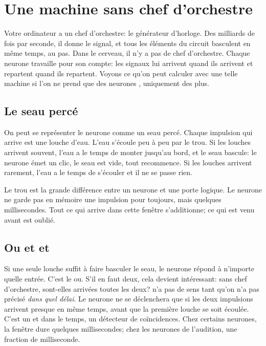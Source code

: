\chapter{Une machine sans chef d'orchestre}

Votre ordinateur a un chef d'orchestre: le générateur d'horloge. Des milliards de fois par seconde, il donne le signal, et tous les éléments du circuit basculent en même temps, au pas. Dans le cerveau, il n'y a pas de chef d'orchestre. Chaque neurone travaille pour son compte: les signaux lui arrivent quand ils arrivent et repartent quand ils repartent. Voyons ce qu'on peut calculer avec une telle machine si l'on ne prend que des neurones , uniquement des \og plus\fg{}.

\section*{Le seau percé}

On peut se représenter le neurone comme un seau percé. Chaque impulsion qui arrive est une louche d'eau. L'eau s'écoule peu à peu par le trou. Si les louches arrivent souvent, l'eau a le temps de monter jusqu'au bord, et le seau bascule: le neurone émet un clic, le seau est vide, tout recommence. Si les louches arrivent rarement, l'eau a le temps de s'écouler et il ne se passe rien.


Le trou est la grande différence entre un neurone et une porte logique. Le neurone ne garde pas en mémoire une impulsion pour toujours, mais quelques millisecondes. Tout ce qui arrive dans cette fenêtre s'additionne; ce qui est venu avant est oublié.

\section*{\og Ou\fg{} et \og et\fg{}}

Si une seule louche suffit à faire basculer le seau, le neurone répond à n'importe quelle entrée. C'est le \og ou\fg{}. S'il en faut deux, cela devient intéressant: sans chef d'orchestre, \og sont-elles arrivées toutes les deux?\fg{} n'a pas de sens tant qu'on n'a pas précisé \emph{dans quel délai}. Le neurone ne se déclenchera que si les deux impulsions arrivent presque en même temps, avant que la première louche se soit écoulée. C'est un \og et dans le temps\fg{}, un détecteur de coïncidences. Chez certains neurones, la fenêtre dure quelques millisecondes; chez les neurones de l'audition, une fraction de milliseconde.

